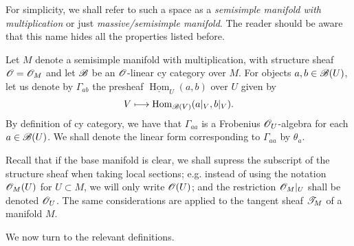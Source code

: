 For simplicity, we shall refer to such a space as a \emph{semisimple manifold with multiplication} or just \emph{massive/semisimple manifold}. The reader should be aware that this name hides all the properties listed before.

Let $M$ denote a semisimple manifold with multiplication, with
structure sheaf $\mathscr{O}=\mathscr{O}_M$ and let $\mathscr{B}$ be an
$\mathscr{O}$-linear {\sc cy} category over $M$. For objects $a,b\in
\mathscr{B}(U)$, let us denote by $\Gamma_{ab}$ the presheaf
$\underline{\operatorname{Hom}}_U(a,b)$ over $U$ given by
\begin{equation}\label{sheaf_maps}
  V\longmapsto \operatorname{Hom}_{\mathscr{B}(V)}(a|_V,b|_V).
\end{equation}
By definition of {\sc cy} category, we have that $\Gamma_{aa}$ is a
Frobenius $\mathscr{O}_U$-algebra for each $a\in
\mathscr{B}(U)$. We shall denote the linear form corresponding to $\Gamma_{aa}$
by $\theta_a$.


\begin{notation}
  Recall that if the base manifold is clear, we shall supress the
  subscript of the structure sheaf when taking local sections;
  e.g. instead of using the notation $\mathscr{O}_M(U)$ for $U\subset M$,
  we will only write $\mathscr{O}(U)$; and the restriction $\mathscr{O}_M|_U$
  shall be denoted $\mathscr{O}_U$. The same considerations are applied to
  the tangent sheaf $\mathscr{T}_M$ of a manifold $M$.
\end{notation}

We now turn to the relevant definitions.

